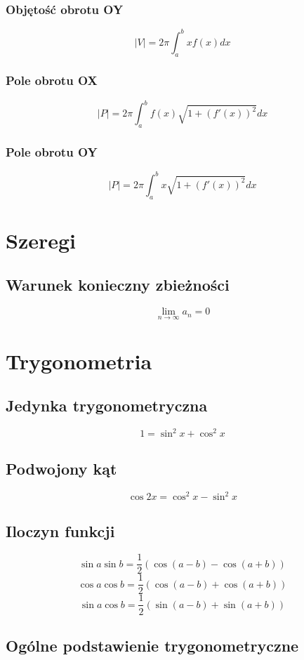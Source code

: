 \documentclass[11pt]{article}
\begin{document}
\subsubsection{Objętość obrotu OY}
$$|V| = 2\pi \int_a^b xf(x) dx$$

\subsubsection{Pole obrotu OX}
$$|P| = 2\pi \int_a^b f(x) \sqrt{1 + (f'(x))^2} dx$$

\subsubsection{Pole obrotu OY}
$$|P| = 2\pi \int_a^b x \sqrt{1 + (f'(x))^2} dx$$

\section{Szeregi}

\subsection{Warunek konieczny zbieżności}
$$\lim_{n \to \infty} a_n = 0$$

\section{Trygonometria}

\subsection{Jedynka trygonometryczna}
$$1 = \sin^2 x + \cos^2 x$$

\subsection{Podwojony kąt}
$$\cos 2x = \cos^2 x - \sin^2 x$$

\subsection{Iloczyn funkcji}
$$\sin a \sin b = \frac{1}{2}(\cos(a - b) - \cos(a + b))$$
$$\cos a \cos b = \frac{1}{2}(\cos(a - b) + \cos(a + b))$$
$$\sin a \cos b = \frac{1}{2}(\sin(a - b) + \sin(a + b))$$

\pagebreak

\subsection{Ogólne podstawienie trygonometryczne}
\end{document}
